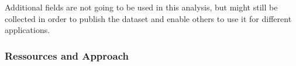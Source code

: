 Additional fields are not going to be used in this analysis, but might still be collected in order to
publish the dataset and enable others to use it for different applications.

%
%
%
%
%
%

\subsubsection{Ressources and Approach}

